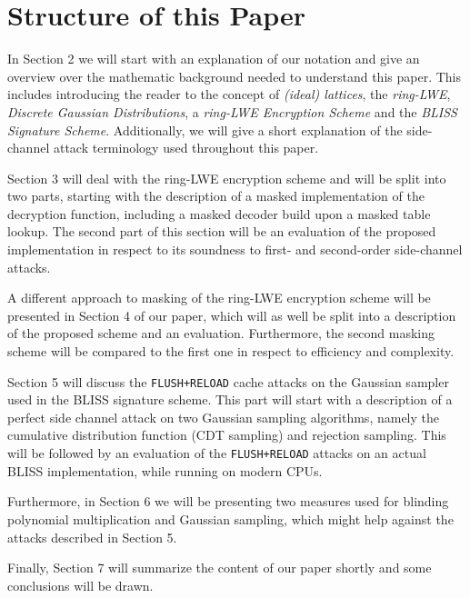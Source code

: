 \section{Structure of this Paper}
In Section 2 we will start with an explanation of our notation and give an overview over the mathematic background needed to understand this paper. This includes introducing the reader to the concept of \textit{(ideal) lattices}, the \textit{\ac{ring-LWE}}, \textit{Discrete Gaussian Distributions}, a \textit{\ac{ring-LWE} Encryption Scheme} and the \textit{BLISS Signature Scheme}. Additionally, we will give a short explanation of the side-channel attack terminology used throughout this paper.

Section 3 will deal with the ring-LWE encryption scheme and will be split into two parts, starting with the description of a masked implementation of the decryption function, including a masked decoder build upon a masked table lookup. The second part of this section will be an evaluation of the proposed implementation in respect to its soundness to first- and second-order side-channel attacks.

A different approach to masking of the \ac{ring-LWE} encryption scheme will be presented in Section 4 of our paper, which will as well be split into a description of the proposed scheme and an evaluation. Furthermore, the second masking scheme will be compared to the first one in respect to efficiency and complexity.

Section 5 will discuss the \verb|FLUSH+RELOAD| cache attacks on the Gaussian sampler used in the \acs{BLISS} signature scheme. This part will start with a description of a perfect side channel attack on two Gaussian sampling algorithms, namely the cumulative distribution function (CDT sampling) and rejection sampling. This will be followed by an evaluation of the \verb|FLUSH+RELOAD| attacks on an actual BLISS implementation, while running on modern CPUs.

Furthermore, in Section 6 we will be presenting two measures used for blinding polynomial multiplication and Gaussian sampling, which might help against the attacks described in Section 5.

Finally, Section 7 will summarize the content of our paper shortly and some conclusions will be drawn.